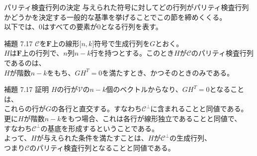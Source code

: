 \documentclass[dvipdfmx,10pt,jsarticle]{beamer}
\begin{document}
  \begin{frame}{パリティ検査行列の決定}
    与えられた符号に対してどの行列がパリティ検査行列かどうかを決定する一般的な基準を挙げることでこの節を締めくくる。\\
    以下では、$0$はすべての要素が$0$となる行列を表す。
    \begin{block}{補題 7.17}
      $\mathcal{C}$を$\mathbf{F}$上の線形$\lbrack n,k\rbrack$符号で生成行列を$G$とおく。\\
      $H$は$\mathbf{F}$上の行列で、$n$列$n-k$行を持つとする。このとき$H$が$\mathcal{C}$のパリティ検査行列であるのは、\\
      $H$が階数$n-k$をもち、$GH^T = 0$を満たすとき、かつそのときのみである。
    \end{block}
  \end{frame}
  \begin{frame}{補題 7.17 証明}
    $H$の行が$\mathcal{V}$の$n-k$個のベクトルからなり、$GH^T = 0$となることは、 \\
    これらの行が$G$の各行と直交する。すなわち$\mathcal{C}^\perp$に含まれることと同値である。\\
    更に$H$が階数$n-k$をもつ場合、これは各行が線形独立であることと同値で、 \\ すなわち$\mathcal{C}^\perp$の基底を形成するということである。\\
    よって、$H$が与えられた条件を満たすことは、$H$が$\mathcal{C}^\perp$の生成行列、\\ つまり$\mathcal{C}$のパリティ検査行列となることと同値である。
  \end{frame}
\end{document}

